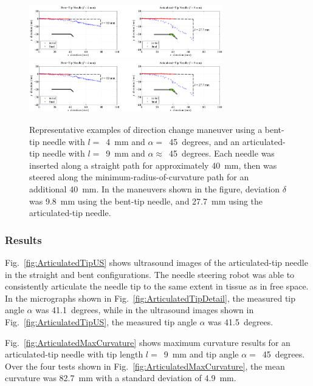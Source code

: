 \begin{figure}[!ht]
\centering
\includegraphics[width=0.75\textwidth]{Images/Chapter3/InsertAndTurn/InsertAndTurn1}
\includegraphics[width=0.75\textwidth]{Images/Chapter3/InsertAndTurn/InsertAndTurn2}
\caption[Maneuvers using bent-tip and articulated-tip needles]{Representative examples of direction change maneuver using a bent-tip needle with $l =$~4~mm and $\alpha =$~45~degrees, and an articulated-tip needle with $l =$~9~mm and $\alpha \approx$~45~degrees. Each needle was inserted along a straight path for approximately 40~mm, then was steered along the minimum-radius-of-curvature path for an additional 40~mm. In the maneuvers shown in the figure, deviation $\delta$ was 9.8~mm using the bent-tip needle, and 27.7~mm using the articulated-tip needle.}
\label{fig:InsertAndTurn}
\end{figure}

\subsubsection{Results}
Fig.~\ref{fig:ArticulatedTipUS} shows ultrasound images of the articulated-tip needle in the straight and bent configurations. The needle steering robot was able to consistently articulate the needle tip to the same extent in tissue as in free space. In the micrographs shown in Fig.~\ref{fig:ArticulatedTipDetail}, the measured tip angle $\alpha$ was 41.1~degrees, while in the ultrasound images shown in Fig.~\ref{fig:ArticulatedTipUS}, the measured tip angle $\alpha$ was 41.5~degrees.

Fig.~\ref{fig:ArticulatedMaxCurvature} shows maximum curvature results for an articulated-tip needle with tip length $l =$~9~mm and tip angle $\alpha =$~45~degrees. Over the four tests shown in Fig.~\ref{fig:ArticulatedMaxCurvature}, the mean curvature was 82.7~mm with a standard deviation of 4.9~mm.       

